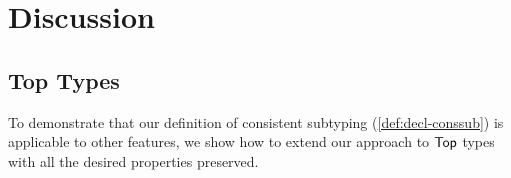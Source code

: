 
\section{Discussion}
\label{sec:discussion}


\subsection{Top Types}
\label{subsec:extension-top}

To demonstrate that our definition of consistent subtyping (\cref{def:decl-conssub}) is
applicable to other features,
we show how to extend our approach to $\mathsf{Top}$ types with all the desired properties preserved.



